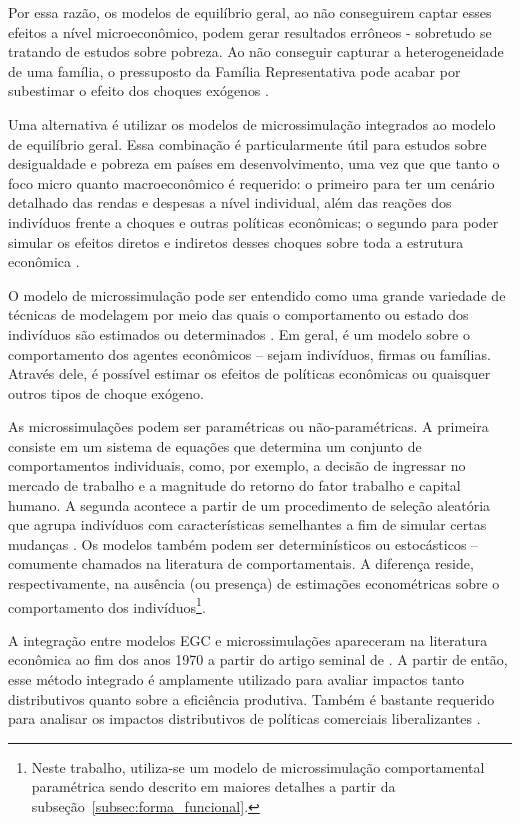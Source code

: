 Por essa razão, os modelos de equilíbrio geral, ao não conseguirem captar esses efeitos a nível microeconômico, podem gerar resultados errôneos - sobretudo se tratando de estudos sobre pobreza. Ao não conseguir capturar a heterogeneidade de uma família, o pressuposto da Família Representativa pode acabar por subestimar o efeito dos choques exógenos \cite{colombo08}. 

Uma alternativa é utilizar os modelos de microssimulação integrados ao modelo de equilíbrio geral. Essa combinação é particularmente útil para estudos sobre desigualdade e pobreza em países em desenvolvimento, uma vez que que tanto o foco micro quanto macroeconômico é requerido: o primeiro para ter um cenário detalhado das rendas e despesas a nível individual, além das reações dos indivíduos frente a choques e outras políticas econômicas; o segundo para poder simular os efeitos diretos e indiretos desses choques sobre toda a estrutura econômica \cite{tiberti17, klevmarken22}.

O modelo de microssimulação pode ser entendido como uma grande variedade de técnicas de modelagem por meio das quais o comportamento ou estado dos indivíduos são estimados ou determinados \cite{figari15}. Em geral, é um modelo sobre o comportamento dos agentes econômicos -- sejam indivíduos, firmas ou famílias. Através dele, é possível estimar os efeitos de políticas econômicas ou quaisquer outros tipos de choque exógeno.

As microssimulações podem ser paramétricas ou não-paramétricas. A primeira consiste em um sistema de equações que determina um conjunto de comportamentos individuais, como, por exemplo, a decisão de ingressar no mercado de trabalho e a magnitude do retorno do fator trabalho e capital humano. A segunda acontece a partir de um procedimento de seleção aleatória que agrupa indivíduos com características semelhantes a fim de simular certas mudanças \cite{tiberti17m}. Os modelos também podem ser determinísticos ou estocásticos -- comumente chamados na literatura de comportamentais. A diferença reside, respectivamente, na ausência (ou presença) de estimações econométricas sobre o comportamento dos indivíduos\footnote{Neste trabalho, utiliza-se um modelo de microssimulação comportamental paramétrica sendo descrito em maiores detalhes a partir da subseção~\ref{subsec:forma_funcional}.}.

A integração entre modelos EGC e microssimulações apareceram na literatura econômica ao fim dos anos 1970 a partir do artigo seminal de \textcite{adelman78}. A partir de então, esse método integrado é amplamente utilizado para avaliar impactos tanto distributivos quanto sobre a eficiência produtiva. Também é bastante requerido para analisar os impactos distributivos de políticas comerciais liberalizantes \cite{carneiro06, ferreira06, raihan10, cicowiez16, mbanda21}.

